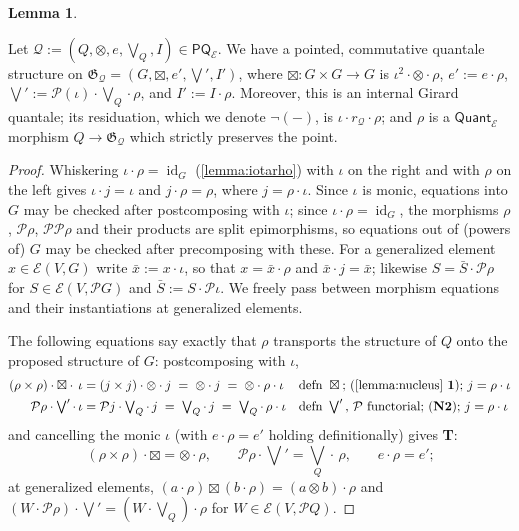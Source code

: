 \documentclass{article}
\makeatletter
\newcommand{\allproofs}{} %
\newif\ifproofsinappendix
\newcommand{\lemmawithproof}[3]{%
  \begin{lemma}\label{#1}
    #2  
    \ifproofsinappendix \hyperref[xxx#1]{(Proof)} \fi
  \end{lemma}
    \ifproofsinappendix
  \g@addto@macro\allproofs{%
    \par\medskip
    \noindent
    \subsection*{\cref{#1}}\par
    #2\par
    \begin{proof}\label{xxx#1}
      #3
    \end{proof}%
  }
      \else

    \begin{proof}
      #3
    \end{proof}
    \fi 
}
\theoremstyle{definition}
\newtheorem{lemma}{Lemma}[section]
\newcommand{\G}{\mathfrak{G}}
\newcommand{\cE}{\mathcal{E}}
\newcommand{\cP}{\mathcal{P}}
\newcommand{\cQ}{\mathcal{Q}}
\newcommand{\cat}[1]{\mathsf{#1}}
\newcommand{\id}{\operatorname{id}}
\makeatother
\begin{document}
\lemmawithproof{lemma:gqquant}{
Let $\cQ:=(Q,\otimes,e,\bigvee_Q,I)\in\cat{PQ}_\cE$. We have a pointed, commutative quantale structure on $\G_\cQ=(G,\boxtimes,e',\bigvee', I')$, where $\boxtimes\colon G\times G\to G$ is $\iota^2\cdot \otimes \cdot \rho$, $e':=e\cdot \rho$, $\bigvee':=\cP(\iota)\cdot \bigvee_Q \cdot \rho$, and $I':=I\cdot\rho$. Moreover, this is an internal Girard quantale; its residuation, which we denote $\neg(-)$, is $\iota\cdot r_\cQ\cdot\rho$; and $\rho$ is a $\cat{Quant}_\cE$ morphism $Q\to\G_\cQ$ which strictly preserves the point.
}{
Whiskering $\iota\cdot\rho=\id_G$ (\cref{lemma:iotarho}) with $\iota$ on the right and with $\rho$ on the left gives $\iota\cdot j=\iota$ and $j\cdot\rho=\rho$, where $j=\rho\cdot\iota$. 
Since $\iota$ is monic, equations into $G$ may be checked after postcomposing with $\iota$; since $\iota\cdot\rho=\id_G$, the morphisms $\rho$, $\cP\rho$, $\cP\cP\rho$ and their products are split epimorphisms, so equations out of (powers of) $G$ may be checked after precomposing with these. 
For a generalized element $x \in \cE(V,G)$ write $\bar x:=x\cdot\iota$, so that $x=\bar x\cdot\rho$ and $\bar x\cdot j=\bar x$; likewise $S=\bar S\cdot\cP\rho$ for $S\in\cE(V,\cP G)$ and $\bar S:=S\cdot\cP\iota$. 
We freely pass between morphism equations and their instantiations at generalized elements.

The following equations say exactly that $\rho$ transports the structure of $Q$ onto the proposed structure of $G$: postcomposing with $\iota$,
\begin{align*}
(\rho\times\rho)\cdot\boxtimes\cdot\,\iota &= (j\times j)\cdot\otimes\cdot j\;=\;\otimes\cdot j\;=\;\otimes\cdot\rho\cdot\iota && \text{defn }\boxtimes\text{; (\cref{lemma:nucleus} {\bf 1}); } j=\rho\cdot\iota\\
\cP\rho\cdot\textstyle\bigvee'\cdot\,\iota &= \cP j\cdot\textstyle\bigvee_Q\cdot\,j\;=\;\textstyle\bigvee_Q\cdot\,j\;=\;\textstyle\bigvee_Q\cdot\,\rho\cdot\iota && \text{defn }\textstyle\bigvee'\text{, }\cP\text{ functorial; ({\bf N2}); } j=\rho\cdot\iota
\end{align*}
and cancelling the monic $\iota$ (with $e\cdot\rho=e'$ holding definitionally) gives {\bf T}:
$$(\rho\times\rho)\cdot\boxtimes = \otimes\cdot\rho\text{,}\qquad \cP\rho\cdot\textstyle\bigvee' = \textstyle\bigvee_Q\cdot\,\rho\text{,}\qquad e\cdot\rho=e'\text{;}$$
at generalized elements, $(a\cdot\rho)\boxtimes(b\cdot\rho)=(a\otimes b)\cdot\rho$ and $(W\cdot\cP\rho)\cdot\bigvee'=(W\cdot\bigvee_Q)\cdot\rho$ for $W\in\cE(V,\cP Q)$.

}
\end{document}
